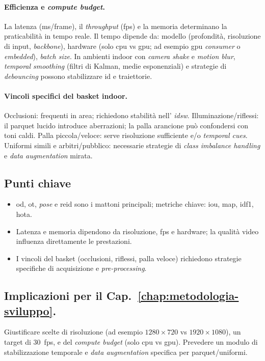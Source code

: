 \documentclass[12pt,a4paper,openright,twoside]{book}
\begin{document}
\paragraph{Efficienza e \emph{compute budget}.} La latenza
(ms/frame), il \emph{throughput} (\ac{fps}) e la memoria
determinano la praticabilità in tempo reale. Il tempo
dipende da: modello (profondità, risoluzione di input, 
\emph{backbone}), hardware (solo \ac{cpu} vs \ac{gpu}; 
ad esempio \ac{gpu} \emph{consumer} o \emph{embedded}), 
\emph{batch size}. In ambienti indoor con \emph{camera shake} 
e \emph{motion blur}, \emph{temporal smoothing} 
(filtri di Kalman, medie esponenziali) e strategie di 
\emph{debouncing} possono stabilizzare \ac{id} e traiettorie.

\paragraph{Vincoli specifici del basket indoor.} 
Occlusioni: frequenti in area; richiedono stabilità nell' 
\emph{\ac{idsw}}. Illuminazione/riflessi: il parquet lucido introduce 
aberrazioni; la palla arancione può confondersi con toni caldi. 
Palla piccola/veloce: serve risoluzione sufficiente e/o 
\emph{temporal cues}. Uniformi simili e arbitri/pubblico: 
necessarie strategie di \emph{class imbalance handling} e 
\emph{data augmentation} mirata.

\subsection*{Punti chiave}
\begin{itemize}
  \item \ac{od}, \ac{ot}, \emph{pose} e \ac{reid} sono i mattoni 
  principali; metriche chiave: \ac{iou}, \ac{map}, \ac{idf1}, \ac{hota}.
  \item Latenza e memoria dipendono da risoluzione, \ac{fps} e hardware; 
  la qualità video influenza direttamente le prestazioni.
  \item I vincoli del basket (occlusioni, riflessi, palla veloce) 
  richiedono strategie specifiche di acquisizione e \emph{pre-processing}.
\end{itemize}

\subsection*{Implicazioni per il Cap.~\ref{chap:metodologia-sviluppo}.}
Giustificare scelte di risoluzione (ad esempio $1280\times720$ vs 
$1920\times1080$), un target di 30~\ac{fps}, e del \emph{compute budget} 
(solo \ac{cpu} vs \ac{gpu}). Prevedere un modulo di stabilizzazione temporale 
e \emph{data augmentation} specifica per parquet/uniformi.
\end{document}
